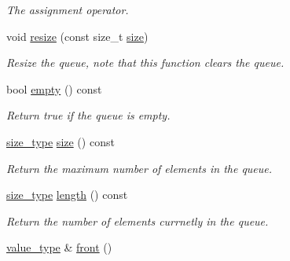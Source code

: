 \begin{DoxyCompactItemize}
\begin{DoxyCompactList}\small\item\em \-The assignment operator. \end{DoxyCompactList}\item 
\hypertarget{classxsens_1_1FifoQueue_a2c02ee912d71b2a476e2513824dee88a}{void \hyperlink{classxsens_1_1FifoQueue_a2c02ee912d71b2a476e2513824dee88a}{resize} (const size\-\_\-t \hyperlink{classxsens_1_1FifoQueue_abdc9950e2a5833b2520b83bc1daee995}{size})}\label{classxsens_1_1FifoQueue_a2c02ee912d71b2a476e2513824dee88a}

\begin{DoxyCompactList}\small\item\em \-Resize the queue, note that this function clears the queue. \end{DoxyCompactList}\item 
\hypertarget{classxsens_1_1FifoQueue_af133de61bb276774138f1aab187b2918}{bool \hyperlink{classxsens_1_1FifoQueue_af133de61bb276774138f1aab187b2918}{empty} () const }\label{classxsens_1_1FifoQueue_af133de61bb276774138f1aab187b2918}

\begin{DoxyCompactList}\small\item\em \-Return true if the queue is empty. \end{DoxyCompactList}\item 
\hypertarget{classxsens_1_1FifoQueue_abdc9950e2a5833b2520b83bc1daee995}{\hyperlink{classxsens_1_1FifoQueue_a6a595ab989816ba96cf0cbfa4d39b0b1}{size\-\_\-type} \hyperlink{classxsens_1_1FifoQueue_abdc9950e2a5833b2520b83bc1daee995}{size} () const }\label{classxsens_1_1FifoQueue_abdc9950e2a5833b2520b83bc1daee995}

\begin{DoxyCompactList}\small\item\em \-Return the maximum number of elements in the queue. \end{DoxyCompactList}\item 
\hypertarget{classxsens_1_1FifoQueue_adade9fdae6da5cb6c3186f9fa15fd118}{\hyperlink{classxsens_1_1FifoQueue_a6a595ab989816ba96cf0cbfa4d39b0b1}{size\-\_\-type} \hyperlink{classxsens_1_1FifoQueue_adade9fdae6da5cb6c3186f9fa15fd118}{length} () const }\label{classxsens_1_1FifoQueue_adade9fdae6da5cb6c3186f9fa15fd118}

\begin{DoxyCompactList}\small\item\em \-Return the number of elements currnetly in the queue. \end{DoxyCompactList}\item 
\hypertarget{classxsens_1_1FifoQueue_a41ec39c634b1b6c9fdb195b0e0bf9b6f}{\hyperlink{classxsens_1_1FifoQueue_a61949842c92df50f702496096b9d5069}{value\-\_\-type} \& \hyperlink{classxsens_1_1FifoQueue_a41ec39c634b1b6c9fdb195b0e0bf9b6f}{front} ()}\label{classxsens_1_1FifoQueue_a41ec39c634b1b6c9fdb195b0e0bf9b6f}


\end{DoxyCompactItemize}
